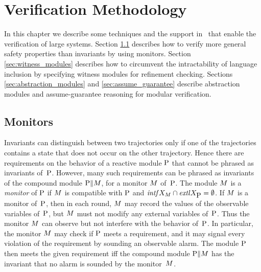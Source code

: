 \chapter {Verification Methodology}
\label{sec:methodology}

In this chapter we describe some techniques and the support in \mocha\
that enable the verification of large systems.
Section \ref{sec:monitors} describes how to verify more general safety
properties than invariants by using monitors. Section
\ref{sec:witness_modules} describes how to circumvent the
intractability of language inclusion by specifying witness modules for
refinement checking. Sections \ref{sec:abstraction_modules} and
\ref{sec:assume_guarantee} describe abstraction modules and
assume-guarantee reasoning for modular verification. 


\section{Monitors}
\label{sec:monitors}
Invariants can distinguish between two trajectories only if one of the 
trajectories contains a state that does not occur on the other trajectory.
Hence there are requirements on the behavior of a reactive module $\mbox{P}$ that 
cannot be phrased as invariants of~$\mbox{P}$.
However, many such requirements can be phrased as invariants of the compound 
module $\mbox{P}\|M$, for a monitor $M$ of~$\mbox{P}$.
The module $M$ is a {\em monitor\/} of $\mbox{P}$ if $M$ is compatible with 
$\mbox{P}$ and ${\it intf}X_{M}\cap{\it extl}X_{\mbox{P}}=\emptyset$.
If $M$ is a monitor of~$\mbox{P}$, then in each round, $M$ may record the 
values of the observable variables of~$\mbox{P}$, but $M$ must not modify any 
external variables of~$\mbox{P}$.
Thus the monitor $M$ can observe but not interfere with the behavior 
of~$\mbox{P}$.
In particular, the monitor $M$ may check if $\mbox{P}$ meets a requirement, and 
it may signal every violation of the requirement by sounding an observable 
alarm.
The module $\mbox{P}$ then meets the given requirement iff the compound module 
$\mbox{P}\|M$ has the invariant that no alarm is sounded by the monitor~$M$.

